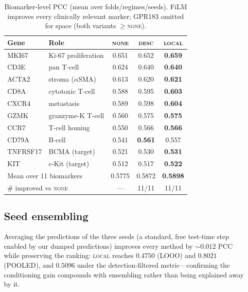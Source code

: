 \documentclass[10pt,twocolumn,letterpaper]{article}
\begin{document}
\begin{table}[t]
\centering
\small
\setlength{\tabcolsep}{4pt}
\begin{tabular}{llccc}
\toprule
Gene & Role & \textsc{none} & \textsc{desc} & \textsc{local} \\
\midrule
MKI67    & Ki-67 proliferation       & 0.651 & 0.652 & \textbf{0.659} \\
CD3E     & pan T-cell                & 0.624 & 0.640 & \textbf{0.640} \\
ACTA2    & stroma ($\alpha$SMA)      & 0.613 & 0.620 & \textbf{0.621} \\
CD8A     & cytotoxic T-cell          & 0.588 & 0.595 & \textbf{0.603} \\
CXCR4    & metastasis                & 0.589 & 0.598 & \textbf{0.604} \\
GZMK     & granzyme-K T-cell         & 0.560 & 0.575 & \textbf{0.575} \\
CCR7     & T-cell homing             & 0.550 & 0.566 & \textbf{0.566} \\
CD79A    & B-cell                    & 0.541 & \textbf{0.561} & 0.557 \\
TNFRSF17 & BCMA (target)             & 0.521 & 0.530 & \textbf{0.531} \\
KIT      & c-Kit (target)            & 0.512 & 0.517 & \textbf{0.522} \\
\midrule
\multicolumn{2}{l}{Mean over 11 biomarkers} & 0.5775 & 0.5872 & \textbf{0.5898} \\
\multicolumn{2}{l}{\# improved vs \textsc{none}} & --- & 11/11 & 11/11 \\
\bottomrule
\end{tabular}
\caption{Biomarker-level PCC (mean over folds/regimes/seeds). FiLM improves every clinically
relevant marker; GPR183 omitted for space (both variants $\ge$\textsc{none}).}
\label{tab:biomarker}
\end{table}

\subsection{Seed ensembling}
Averaging the predictions of the three seeds (a standard, free test-time step enabled by our
dumped predictions) improves every method by ${\sim}0.012$ PCC while preserving the ranking:
\textsc{local} reaches $0.4750$ (LOOO) and $0.8021$ (POOLED), and $0.5096$ under the
detection-filtered metric---confirming the conditioning gain compounds with ensembling rather
than being explained away by it.
\end{document}
